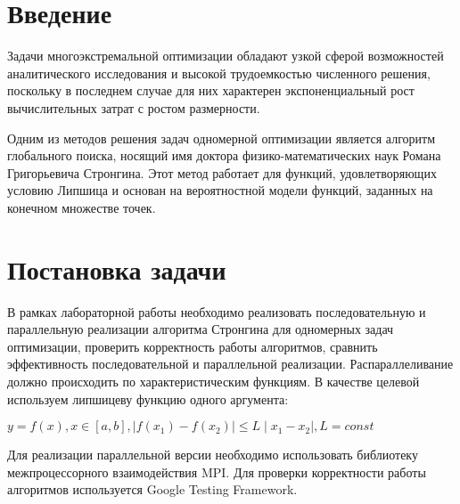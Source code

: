 \documentclass{report}
\begin{document}
\setcounter{page}{2}

\tableofcontents
\newpage

\section*{Введение}
Задачи многоэкстремальной оптимизации обладают узкой сферой возможностей аналитического исследования и высокой трудоемкостью численного решения, поскольку в последнем случае для них характерен экспоненциальный рост вычислительных затрат с ростом размерности.
\par Одним из методов решения задач одномерной оптимизации является алгоритм глобального поиска, носящий имя доктора физико-математических наук Романа Григорьевича Стронгина. Этот метод работает для функций, удовлетворяющих условию Липшица и основан на вероятностной модели функций, заданных на конечном множестве точек.

\newpage

\section*{Постановка задачи}
В рамках лабораторной работы необходимо реализовать последовательную и параллельную реализации алгоритма Стронгина для одномерных задач оптимизации, проверить корректность работы алгоритмов, сравнить эффективность последовательной и параллельной реализации. Распараллеливание должно происходить по характеристическим функциям. В качестве целевой используем липшицеву функцию одного аргумента: 
\par $y = f(x), x\in[a, b], \mid f(x_1) - f(x_2) \mid \le L \mid x_1 - x_2 \mid , L = const $
\par Для реализации параллельной версии необходимо использовать библиотеку межпроцессорного взаимодействия MPI. Для проверки корректности работы алгоритмов используется Google Testing Framework.
\newpage

\end{document}
